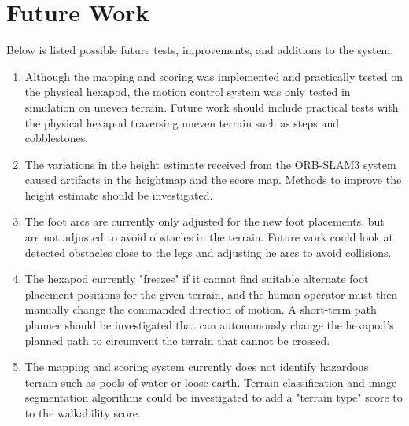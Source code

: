     \section{Future Work}
        Below is listed possible future tests, improvements, and additions to the system.

        \begin{enumerate}
            \item Although the mapping and scoring was implemented and practically tested on the physical hexapod, the motion control system was only tested in simulation on uneven terrain. Future work should include practical tests with the physical hexapod traversing uneven terrain such as steps and cobblestones.            
            \item The variations in the height estimate received from the ORB-SLAM3 system caused artifacts in the heightmap and the score map. Methods to improve the height estimate should be investigated.
            \item The foot arcs are currently only adjusted for the new foot placements, but are not adjusted to avoid obstacles in the terrain. Future work could look at detected obstacles close to the legs and adjusting he arcs to avoid collisions.
            \item The hexapod currently "freezes" if it cannot find suitable alternate foot placement positions for the given terrain, and the human operator must then manually change the commanded direction of motion. A short-term path planner should be investigated that can autonomously change the hexapod's planned path to circumvent the terrain that cannot be crossed.
            \item The mapping and scoring system currently does not identify hazardous terrain such as pools of water or loose earth. Terrain classification and image segmentation algorithms could be investigated to add a "terrain type" score to to the walkability score.

            
        \end{enumerate}